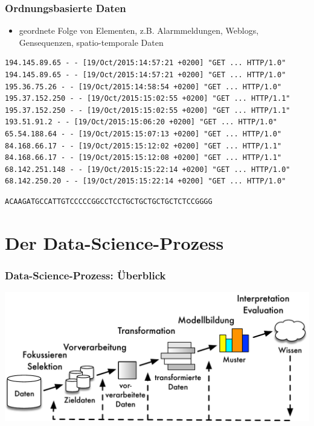 
\begin{frame}[fragile]
\frametitle{Ordnungsbasierte Daten}

\begin{itemize}
\item geordnete Folge von Elementen, z.B. Alarmmeldungen, Weblogs, Gensequenzen, spatio-temporale Daten
\end{itemize}

{\scriptsize
\begin{verbatim}
194.145.89.65 - - [19/Oct/2015:14:57:21 +0200] "GET ... HTTP/1.0"
194.145.89.65 - - [19/Oct/2015:14:57:21 +0200] "GET ... HTTP/1.0"
195.36.75.26 - - [19/Oct/2015:14:58:54 +0200] "GET ... HTTP/1.0"
195.37.152.250 - - [19/Oct/2015:15:02:55 +0200] "GET ... HTTP/1.1"
195.37.152.250 - - [19/Oct/2015:15:02:55 +0200] "GET ... HTTP/1.1"
193.51.91.2 - - [19/Oct/2015:15:06:20 +0200] "GET ... HTTP/1.0"
65.54.188.64 - - [19/Oct/2015:15:07:13 +0200] "GET ... HTTP/1.0"
84.168.66.17 - - [19/Oct/2015:15:12:02 +0200] "GET ... HTTP/1.1"
84.168.66.17 - - [19/Oct/2015:15:12:08 +0200] "GET ... HTTP/1.1"
68.142.251.148 - - [19/Oct/2015:15:22:14 +0200] "GET ... HTTP/1.0"
68.142.250.20 - - [19/Oct/2015:15:22:14 +0200] "GET ... HTTP/1.0"
\end{verbatim}
}

{%
\begin{verbatim}
ACAAGATGCCATTGTCCCCCGGCCTCCTGCTGCTGCTGCTCTCCGGGG
\end{verbatim}
}

\end{frame}


\section{Der Data-Science-Prozess}

\begin{frame}[c]
\frametitle{Data-Science-Prozess: Überblick}

\includegraphics[scale=.6]{fig1/kdd-prozess.pdf}

\end{frame}

